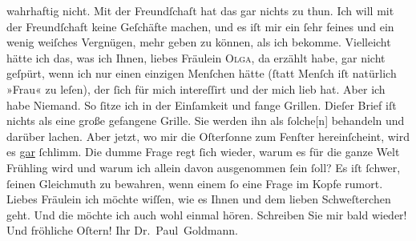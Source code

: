 \begin{ledgroupsized}[t]{13cm}
               wahrhaftig nicht. Mit der Freundſchaſt hat das gar nichts zu thun. Ich will mit der
               Freundſchaft keine Geſchäfte machen, und es iſt mir ein ſehr feines und ein wenig
               weiſches Vergnügen, mehr geben zu können, als ich bekomme.\pend
           \pstart
           Vielleicht hätte ich das, was ich Ihnen, liebes Fräulein \textsc{Olga}, da erzählt habe, gar nicht geſpürt, wenn ich \strikeout{\textcolor{gray}{×}} nur einen einzigen Menſchen hätte (ſtatt Menſch iſt natürlich »Frau« zu
               leſen), der ſich für mich intereſſirt und der mich lieb hat. Aber ich habe {\pb}Niemand. So ſitze ich in der
               Einſamkeit und fange Grillen. Dieſer Brief iſt nichts als eine große gefangene
               Grille. Sie werden ihn als ſolche{[}n{]} behandeln und darüber lachen.
               Aber jetzt, wo mir die Oſterſonne zum Fenſter
               hereinſcheint, wird es \uline{gar} ſchlimm. Die dumme Frage
               regt ſich wieder, warum es für die ganze Welt Frühling wird und warum ich allein
               davon ausgenommen ſein ſoll? Es iſt ſchwer, ſeinen Gleichmuth zu bewahren, wenn einem
               ſo eine Frage im Kopfe rumort.\pend
           \pstart Liebes Fräulein ich möchte wiſſen, wie es Ihnen und dem lieben Schweſterchen geht. Und die \label{K_L03524-3v}\label{K_L03524-3h} möchte ich auch wohl einmal hören. Schreiben Sie mir bald wieder!
               Und fröhliche Oſtern! Ihr \spacefill\mbox{Dr. Paul
                  Goldmann.}\pend{}\pstart

\end{ledgroupsized}
